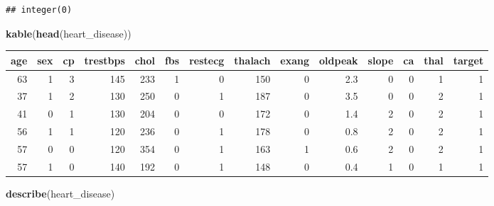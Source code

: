 \documentclass[]{article}
\newenvironment{Shaded}{\begin{snugshade}}{\end{snugshade}}
\newcommand{\KeywordTok}[1]{\textcolor[rgb]{0.13,0.29,0.53}{\textbf{#1}}}
\newcommand{\NormalTok}[1]{#1}
\begin{document}
\begin{verbatim}
## integer(0)
\end{verbatim}

\begin{Shaded}
\begin{Highlighting}[]
\KeywordTok{kable}\NormalTok{(}\KeywordTok{head}\NormalTok{(heart_disease))}
\end{Highlighting}
\end{Shaded}

\begin{longtable}[]{@{}rrrrrrrrrrrrrr@{}}
\toprule
age & sex & cp & trestbps & chol & fbs & restecg & thalach & exang &
oldpeak & slope & ca & thal & target\tabularnewline
\midrule
\endhead
63 & 1 & 3 & 145 & 233 & 1 & 0 & 150 & 0 & 2.3 & 0 & 0 & 1 &
1\tabularnewline
37 & 1 & 2 & 130 & 250 & 0 & 1 & 187 & 0 & 3.5 & 0 & 0 & 2 &
1\tabularnewline
41 & 0 & 1 & 130 & 204 & 0 & 0 & 172 & 0 & 1.4 & 2 & 0 & 2 &
1\tabularnewline
56 & 1 & 1 & 120 & 236 & 0 & 1 & 178 & 0 & 0.8 & 2 & 0 & 2 &
1\tabularnewline
57 & 0 & 0 & 120 & 354 & 0 & 1 & 163 & 1 & 0.6 & 2 & 0 & 2 &
1\tabularnewline
57 & 1 & 0 & 140 & 192 & 0 & 1 & 148 & 0 & 0.4 & 1 & 0 & 1 &
1\tabularnewline
\bottomrule
\end{longtable}

\begin{Shaded}
\begin{Highlighting}[]
\KeywordTok{describe}\NormalTok{(heart_disease)}
\end{Highlighting}
\end{Shaded}
\end{document}

